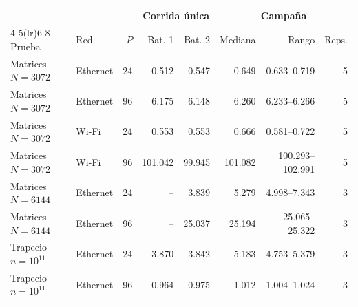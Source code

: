 \begin{center}\small
\begin{tabular}{llrrrrrr}
\toprule
 & & & \multicolumn{2}{c}{Corrida única} & \multicolumn{3}{c}{Campaña} \\
\cmidrule(lr){4-5}\cmidrule(lr){6-8}
Prueba & Red & $P$ & Bat. 1 & Bat. 2 & Mediana & Rango & Reps. \\
\midrule
Matrices $N=3072$ & Ethernet & 24 & 0.512 & 0.547 & 0.649 & 0.633--0.719 & 5 \\
Matrices $N=3072$ & Ethernet & 96 & 6.175 & 6.148 & 6.260 & 6.233--6.266 & 5 \\
Matrices $N=3072$ & Wi-Fi & 24 & 0.553 & 0.553 & 0.666 & 0.581--0.722 & 5 \\
Matrices $N=3072$ & Wi-Fi & 96 & 101.042 & 99.945 & 101.082 & 100.293--102.991 & 5 \\
Matrices $N=6144$ & Ethernet & 24 & -- & 3.839 & 5.279 & 4.998--7.343 & 3 \\
Matrices $N=6144$ & Ethernet & 96 & -- & 25.037 & 25.194 & 25.065--25.322 & 3 \\
Trapecio $n=10^{11}$ & Ethernet & 24 & 3.870 & 3.842 & 5.183 & 4.753--5.379 & 3 \\
Trapecio $n=10^{11}$ & Ethernet & 96 & 0.964 & 0.975 & 1.012 & 1.004--1.024 & 3 \\
\bottomrule
\end{tabular}
\end{center}
